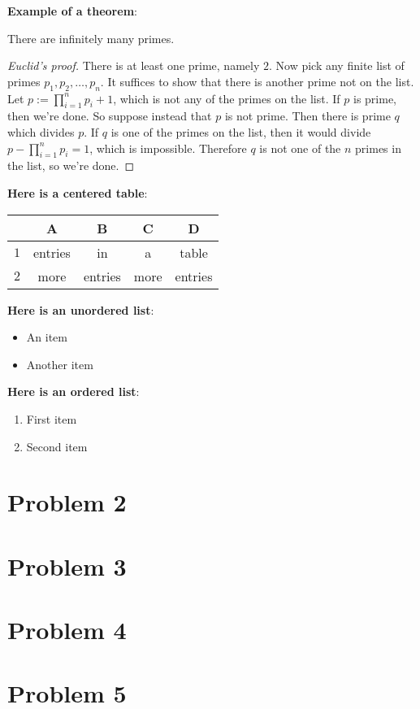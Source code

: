 \documentclass[twoside,11pt]{homework}
\begin{document}
\textbf{Example of a theorem}:
\begin{theorem}[Euclid]
  \label{thm:euclid}
  There are infinitely many primes.
\end{theorem}
\begin{proof}[Euclid's proof]
  There is at least one prime, namely $2$.
  Now pick any finite list of primes $p_1, p_2, \dotsc, p_n$.
  It suffices to show that there is another prime not on the list.
  Let $p := \prod_{i=1}^n p_i + 1$, which is not any of the primes on
  the list.
  If $p$ is prime, then we're done.
  So suppose instead that $p$ is not prime.
  Then there is prime $q$ which divides $p$.
  If $q$ is one of the primes on the list, then it would divide $p -
  \prod_{i=1}^n p_i = 1$, which is impossible.
  Therefore $q$ is not one of the $n$ primes in the list, so we're
  done.
\end{proof}

\textbf{Here is a centered table}:
\begin{center}
  \begin{tabular}{c||c|c|c|c}
    & A
    & B
    & C
    & D \\
    \hline
    \hline
    $1$
    & entries
    & in
    & a
    & table
    \\
    \hline
    $2$
    & more
    & entries
    & more
    & entries
  \end{tabular}
\end{center}

\textbf{Here is an unordered list}:
\begin{itemize}
  \item
    An item

  \item
    Another item

\end{itemize}

\textbf{Here is an ordered list}:
\begin{enumerate}
  \item
    First item

  \item
    Second item

\end{enumerate}

\section*{Problem 2}


\section*{Problem 3}


\section*{Problem 4}


\section*{Problem 5}

\end{document}
